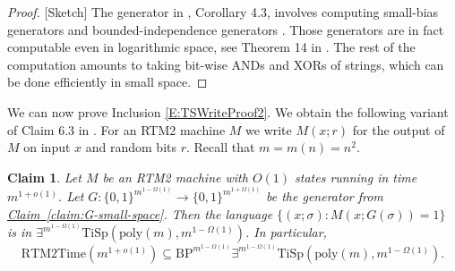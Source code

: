 \documentclass[11pt]{article}
\numberwithin{equation}{section}
\newtheorem{claim}[theorem]{Claim}
\theoremstyle{definition}
\theoremstyle{plain}
\newcommand{\expref}[2]{\hyperref[#2]{#1~\ref{#2}}}
\newcommand{\zo}{\{0, 1\}}
\newcommand{\poly}{\mathrm{poly}}
\newcommand{\TiSp}[2]{\ensuremath{\mathrm{TiSp} \left(#1,#2 \right)}}
\newcommand{\BP}[1]{\ensuremath{\mathrm{BP}^{#1}}}
\newcommand{\RTMTime}[1]{\ensuremath{\mathrm{RTM2Time} \left( #1 \right)}}
\begin{document}
\begin{proof}
{[}Sketch{]} The generator in \cite{ForbesKelley-2018}, Corollary
4.3, involves computing small-bias generators \cite{NaN93,AGHP92}
and bounded-independence generators \cite{ChG89,ABI86}. Those generators
are in fact computable even in logarithmic space, see Theorem 14 in
\cite{HeV06}. The rest of the computation amounts to taking bit-wise
ANDs and XORs of strings, which can be done efficiently in small space.
\end{proof}
We can now prove Inclusion \eqref{E:TSWriteProof2}. We obtain the
following variant of Claim 6.3 in \cite{ViolaBPvsE}. For an RTM2
machine $M$ we write $M(x;r)$ for the output of $M$ on input $x$
and random bits $r$. Recall that $m=m(n)=n^{2}$.
\begin{claim}
\label{claim:RTM-in-TiSp} Let $M$ be an RTM2 machine with $O(1)$
states running in time $m^{1+o(1)}$. Let $G:\zo^{m^{1-\Omega(1)}}\to\zo^{m^{1+\Omega(1)}}$
be the generator from \expref{Claim}{claim:G-small-space}. Then the language
$\{(x;\sigma):M(x;G(\sigma))=1\}$ is in $\exists^{m^{1-\Omega(1)}}\TiSp{\poly(m)}{m^{1-\Omega(1)}}$.
In particular,
\[
\RTMTime{m^{1+o(1)}}\subseteq\BP{m^{1-\Omega(1)}}\exists^{m^{1-\Omega(1)}}\TiSp{\poly(m)}{m^{1-\Omega(1)}}.
\]
\end{claim}
\end{document}
